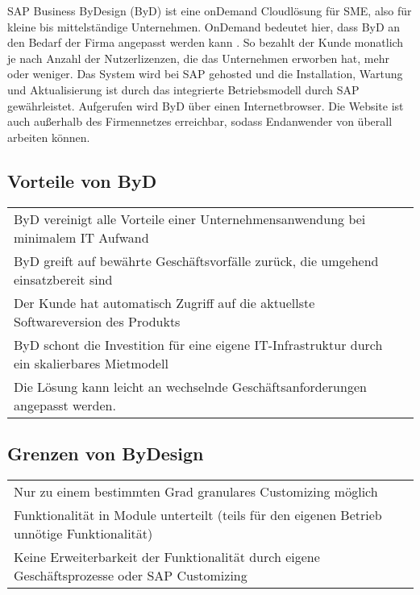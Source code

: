 \documentclass{handout}
\begin{document}
SAP Business ByDesign (ByD) ist eine onDemand Cloudlösung für SME, also für kleine bis mittelständige Unternehmen. OnDemand bedeutet hier, dass ByD an den Bedarf der Firma angepasst werden kann \cite{OnDemandDefinition}. So bezahlt der Kunde monatlich je nach Anzahl der Nutzerlizenzen, die das Unternehmen erworben hat, mehr oder weniger. Das System wird bei SAP gehosted und die Installation, Wartung und Aktualisierung ist durch das integrierte Betriebsmodell durch SAP gewährleistet. Aufgerufen wird ByD über einen Internetbrowser. Die Website ist auch außerhalb des Firmennetzes erreichbar, sodass Endanwender von überall arbeiten können.

\subsection{Vorteile von ByD}

\small
\begin{tabular}{L l}
ByD vereinigt alle Vorteile einer Unternehmensanwendung bei minimalem IT Aufwand\\
ByD greift auf bewährte Geschäftsvorfälle zurück, die umgehend einsatzbereit sind\\
Der Kunde hat automatisch Zugriff auf die aktuellste Softwareversion des Produkts\\
ByD schont die Investition für eine eigene IT-Infrastruktur durch ein skalierbares Mietmodell\\
Die Lösung kann leicht an wechselnde Geschäftsanforderungen angepasst werden.\\
\end{tabular}
\normalsize

\subsection{Grenzen von ByDesign}

\small
\begin{tabular}{L l}
Nur zu einem bestimmten Grad granulares Customizing möglich\\
Funktionalität in Module unterteilt (teils für den eigenen Betrieb unnötige Funktionalität)\\
Keine Erweiterbarkeit der Funktionalität durch eigene Geschäftsprozesse oder SAP Customizing\\
\end{tabular}
\normalsize


\newpage


\end{document}
